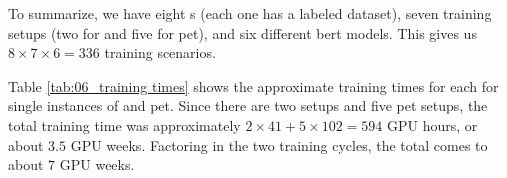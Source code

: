 \label{06_methodology_summary}


To summarize, we have eight \contentType{}s (each one has a labeled dataset), seven training setups (two for \finetuning{} and five for \gls{pet}), and six different \gls{bert} models. This gives us $8\times 7 \times 6 = 336$ training scenarios.



Table \ref{tab:06_training times} shows the approximate training times for each \contentType{} for single instances of \finetuning{} and \gls{pet}. Since there are two \finetuning{} setups and five \gls{pet} setups, the total training time was approximately $2\times 41 + 5 \times 102 = 594 $ GPU hours, or about $3.5$ GPU weeks.
Factoring in the two training cycles, the total comes to about $7$ GPU weeks.
